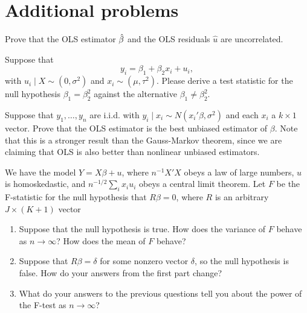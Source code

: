 

\chapter{Additional problems}

\begin{hw}
  Prove that the OLS estimator $\hat{\beta}$ and the OLS residuals $\hat u$
  are uncorrelated.
\end{hw}

\begin{hw}
  Suppose that
  \begin{equation}
    y_i = \beta_1 + \beta_2 x_i + u_i,
  \end{equation}
  with $u_i \mid X \sim (0, \sigma^2)$ and $x_i \sim (\mu,\tau^2)$.
  Please derive a test statistic for the null hypothesis $\beta_1 =
  \beta_2^2$ against the alternative $\beta_1 \neq \beta_2^2$.
\end{hw}

\begin{hw}
  Suppose that $y_1,\dots,y_n$ are i.i.d. with $y_i \mid x_i \sim
  N(x_i'\beta, \sigma^2)$ and each $x_i$ a $k \times 1$ vector. Prove
  that the OLS estimator is the best unbiased estimator of $\beta$.
  Note that this is a stronger result than the Gauss-Markov theorem,
  since we are claiming that OLS is also better than nonlinear
  unbiased estimators.
\end{hw}

\begin{hw}
  We have the model $Y = X\beta + u$, where $n^{-1} X'X$ obeys a law
  of large numbers, $u$ is homoskedastic, and $n^{-1/2} \sum_i x_i
  u_i$ obeys a central limit theorem. Let $F$ be the F-statistic for
  the null hypothesis that $R\beta = 0$, where $R$ is an arbitrary $J
  \times (K + 1)$ vector
  \begin{enumerate}
  \item Suppose that the null hypothesis is true. How does the
    variance of $F$ behave as $n \to \infty$? How does the mean of
    $F$ behave?
  \item Suppose that $R\beta = \delta$ for some nonzero vector
    $\delta$, so the null hypothesis is false. How do your answers
    from the first part change?
  \item What do your answers to the previous questions tell you about
    the power of the F-test as $n \to \infty$?
  \end{enumerate}
\end{hw}

